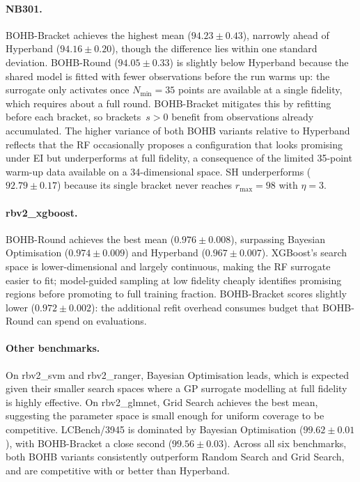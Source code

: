 \documentclass{AIM_report}
\begin{document}
\paragraph{NB301.}
BOHB-Bracket achieves the highest mean ($94.23{\pm}0.43$), narrowly
ahead of Hyperband ($94.16{\pm}0.20$), though the difference lies
within one standard deviation.
BOHB-Round ($94.05{\pm}0.33$) is slightly below Hyperband because
the shared model is fitted with fewer observations before the run
warms up: the surrogate only activates once $N_{\min}{=}35$ points
are available at a single fidelity, which requires about a full round.
BOHB-Bracket mitigates this by refitting before each bracket, so
brackets~$s{>}0$ benefit from observations already accumulated.
The higher variance of both BOHB variants relative to Hyperband reflects
that the RF occasionally proposes a configuration that looks promising
under EI but underperforms at full fidelity, a consequence of the
limited 35-point warm-up data available on a 34-dimensional space.
SH underperforms ($92.79{\pm}0.17$) because its single bracket never
reaches $r_{\max}{=}98$ with $\eta{=}3$.

\paragraph{rbv2\_xgboost.}
BOHB-Round achieves the best mean ($0.976{\pm}0.008$), surpassing
Bayesian Optimisation ($0.974{\pm}0.009$) and Hyperband ($0.967{\pm}0.007$).
XGBoost's search space is lower-dimensional and largely continuous,
making the RF surrogate easier to fit; model-guided sampling at low
fidelity cheaply identifies promising regions before promoting to full
training fraction.
BOHB-Bracket scores slightly lower ($0.972{\pm}0.002$): the additional
refit overhead consumes budget that BOHB-Round can spend on evaluations.

\paragraph{Other benchmarks.}
On rbv2\_svm and rbv2\_ranger, Bayesian Optimisation leads, which is
expected given their smaller search spaces where a GP surrogate modelling
at full fidelity is highly effective.
On rbv2\_glmnet, Grid Search achieves the best mean, suggesting the
parameter space is small enough for uniform coverage to be competitive.
LCBench/3945 is dominated by Bayesian Optimisation ($99.62{\pm}0.01$),
with BOHB-Bracket a close second ($99.56{\pm}0.03$).
Across all six benchmarks, both BOHB variants consistently outperform
Random Search and Grid Search, and are competitive with or better than
Hyperband.
\end{document}
